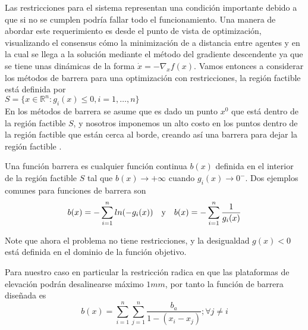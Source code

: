 

Las restricciones para el sistema representan una condición importante debido a que si no se cumplen podría fallar todo el funcionamiento. Una manera de abordar este requerimiento es desde el punto de vista de optimización, visualizando el consensus cómo la minimización de a distancia entre agentes  y en la cual se llega a la solución mediante el método del gradiente descendente ya que se tiene unas dinámicas de la forma $\dot{x}=-\nabla_xf(x)$. Vamos entonces a considerar los métodos de barrera para una optimización con restricciones, la región factible está definida por\\
$S=\{x\in \mathbb{R}^n : g_i(x)\leq 0, i=1,\ldots,n \}$\\
En los métodos de barrera se asume que es dado un punto $x^0$ que está dentro de la región factible $S$, y nosotros imponemos un alto costo en los puntos dentro de la región factible que están cerca al borde, creando así una barrera para dejar la región factible \cite{barriermethods_epelman}.

Una función barrera es cualquier función continua $b(x)$ definida en el interior de la región factible $S$ tal que $b(x)\rightarrow +\infty$ cuando $g_i(x) \rightarrow 0^-$.\cite{Nonlinear_Programming_zorning}  Dos ejemplos comunes para funciones de barrera son\\
\begin{equation}
b(x)=-\sum_{i=1}^{n}ln(-g_i(x)) \ \ \ \textnormal{y} \ \ \ b(x)=-\sum_{i=1}^{n}\frac{1}{g_i(x)}
\label{eq_barriermethods}
\end{equation}

Note que ahora el problema no tiene restricciones, y la desigualdad $g(x)<0$ está definida en el dominio de la función objetivo.

Para nuestro caso en particular la restricción radica en que las plataformas de elevación podrán desalinearse máximo $1mm$, por tanto la función de barrera diseñada es
\begin{equation}
b(x)=\sum_{i=1}^{n}\sum_{j=1}^{n}\frac{b_a}{1-(x_i-x_j)}; \forall j\neq i
\end{equation}


